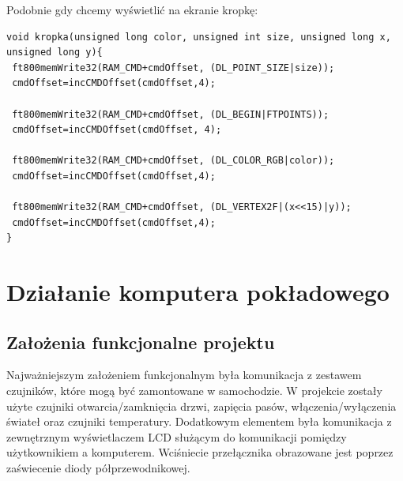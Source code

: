 \documentclass{xmgr}
\begin{document}
Podobnie gdy chcemy wyświetlić na ekranie kropkę:
\begin{lstlisting}[label=bot-dirs-alg,caption=Narysowanie kropki na ekranie]
void kropka(unsigned long color, unsigned int size, unsigned long x, 
unsigned long y){ 
 ft800memWrite32(RAM_CMD+cmdOffset, (DL_POINT_SIZE|size));
 cmdOffset=incCMDOffset(cmdOffset,4);

 ft800memWrite32(RAM_CMD+cmdOffset, (DL_BEGIN|FTPOINTS));
 cmdOffset=incCMDOffset(cmdOffset, 4);

 ft800memWrite32(RAM_CMD+cmdOffset, (DL_COLOR_RGB|color));
 cmdOffset=incCMDOffset(cmdOffset,4);
 
 ft800memWrite32(RAM_CMD+cmdOffset, (DL_VERTEX2F|(x<<15)|y));
 cmdOffset=incCMDOffset(cmdOffset,4);
}
\end{lstlisting}


\chapter{Działanie komputera pokładowego}
\section{Założenia funkcjonalne projektu}
Najważniejszym założeniem funkcjonalnym była komunikacja z zestawem czujników, które mogą być zamontowane w samochodzie. W projekcie zostały użyte czujniki otwarcia/zamknięcia drzwi, zapięcia pasów, włączenia/wyłączenia świateł oraz czujniki temperatury. Dodatkowym elementem była komunikacja z zewnętrznym wyświetlaczem LCD służącym do komunikacji pomiędzy użytkownikiem a komputerem. Wciśniecie przełącznika obrazowane jest poprzez zaświecenie diody półprzewodnikowej.
\end{document}

